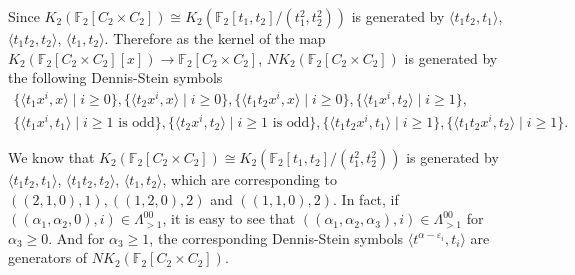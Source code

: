 Since $K_2(\mathbb{F}_2[C_2\times C_2])\cong K_2(\mathbb{F}_2[t_1,t_2]/(t_1^2,t_2^2))$ is generated by $\langle t_1t_2,t_1\rangle$, $\langle t_1t_2,t_2\rangle$, $\langle t_1,t_2\rangle$. Therefore as the kernel of the map $K_2(\mathbb{F}_2[C_2\times C_2][x])\longrightarrow \mathbb{F}_2[C_2\times C_2]$, $NK_2(\mathbb{F}_2[C_2\times C_2])$ is generated by the following Dennis-Stein symbols
\begin{gather*}
	\{\langle t_1x^i,x \rangle \mid i\geq 0\},\{\langle t_2x^i,x \rangle \mid i\geq 0\},\{\langle t_1t_2x^i,x \rangle \mid i\geq 0\},\{\langle t_1x^i,t_2 \rangle \mid i\geq 1\},\\
	\{\langle t_1x^i,t_1 \rangle \mid i\geq 1 \text{ is odd}\},\{\langle t_2x^i,t_2 \rangle \mid i\geq 1 \text{ is odd}\},\{\langle t_1t_2x^i,t_1 \rangle \mid i\geq 1\},\{\langle t_1t_2x^i,t_2 \rangle \mid i\geq 1\}.
\end{gather*}

\begin{remark}
	We know that $K_2(\mathbb{F}_2[C_2\times C_2])\cong K_2(\mathbb{F}_2[t_1,t_2]/(t_1^2,t_2^2))$ is generated by $\langle t_1t_2,t_1\rangle$, $\langle t_1t_2,t_2\rangle$, $\langle t_1,t_2\rangle$, which are corresponding to $((2,1,0),1),((1,2,0),2)$ and $((1,1,0),2)$. In fact, if $((\alpha_1,\alpha_2,0),i)\in \Lambda_{>1}^{00}$, it is easy to see that $((\alpha_1,\alpha_2,\alpha_3),i)\in \Lambda_{>1}^{00}$ for $\alpha_3\geq 0$. And for $\alpha_3\geq 1$, the corresponding Dennis-Stein symbols $\langle t^{\alpha-\varepsilon_i},t_{i} \rangle$ are generators of $NK_2(\mathbb{F}_{2}[C_2\times C_2])$. 
\end{remark}


